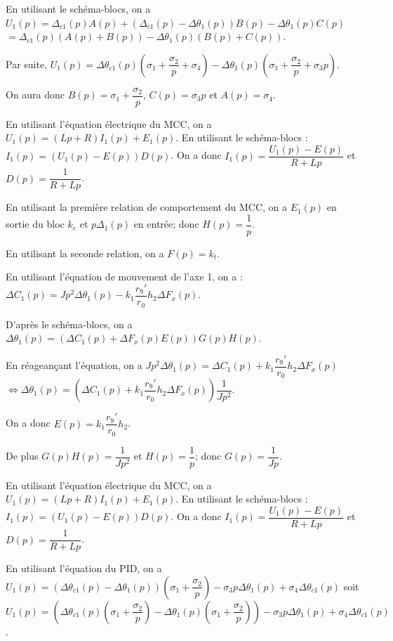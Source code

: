 \begin{corrigebox}
En utilisant le schéma-blocs, on a 
$U_1(p)=\Delta_{c1}(p) A(p) + \left(\Delta_{c1}(p) -\Delta\theta_{1}(p)\right) B(p) - \Delta\theta_{1}(p)C(p)$
$=\Delta_{c1}(p) \left( A(p) + B(p)\right) -\Delta\theta_{1}(p)  \left(B(p)+C(p)\right)$.

Par suite, 
$U_1(p)= \Delta \theta_{c1}(p) \left(\sigma_1 + \dfrac{\sigma_2}{p} +\sigma_4\right) -\Delta \theta_1(p) \left(\sigma_1 + \dfrac{\sigma_2}{p} + \sigma_3p\right)$.

On aura donc $B(p)=\sigma_1 + \dfrac{\sigma_2}{p}$, $C(p)=\sigma_3 p$ et  $A(p)=\sigma_4$.

En utilisant l'équation électrique du MCC, on a 
$U_1(p)=\left(L p   + R\right)I_1(p)+E_1(p)$. En utilisant le schéma-blocs :  $I_1(p)=\left(U_1(p) - E(p)\right) D(p)$. On a donc 
$I_1(p)=\dfrac{U_1(p) - E(p)}{R+Lp}$ et $D(p) = \dfrac{1}{R+Lp}$.

En utilisant la première relation de comportement du MCC, on a $E_1(p)$ en sortie du bloc $k_e$ et $p\Delta_1(p)$ en entrée; donc $H(p)=\dfrac{1}{p}$.

En utilisant la seconde relation, on a $F(p)=k_t$.

En utilisant l'équation de mouvement de l'axe 1, on a :
$\Delta C_1(p)=J p ^2  \Delta \theta_1(p) - k_1 \dfrac{r_9'}{r_0}h_2 \Delta F_x(p)$.

D'après le schéma-blocs, on a $\Delta \theta_1(p) = \left(\Delta C_1(p)+\Delta F_x(p) E(p)\right) G(p)H(p)$.

En réageançant l'équation, on a 
$J p ^2  \Delta \theta_1(p) = \Delta C_1(p) +  k_1 \dfrac{r_9'}{r_0}h_2 \Delta F_x(p) $
$ \Leftrightarrow   \Delta \theta_1(p) = \left(\Delta C_1(p) +  k_1 \dfrac{r_9'}{r_0}h_2 \Delta F_x(p)\right) \dfrac{1}{J p ^2} $.

On a donc $E(p)= k_1 \dfrac{r_9'}{r_0}h_2 $. 

De plus $G(p)H(p)=\dfrac{1}{Jp^2}$ et $H(p)=\dfrac{1}{p}$; donc $G(p)=\dfrac{1}{Jp}$.

En utilisant l'équation électrique du MCC, on a 
$U_1(p)=\left(L p   + R\right)I_1(p)+E_1(p)$. En utilisant le schéma-blocs :  $I_1(p)=\left(U_1(p) - E(p)\right) D(p)$. On a donc 
$I_1(p)=\dfrac{U_1(p) - E(p)}{R+Lp}$ et $D(p) = \dfrac{1}{R+Lp}$.

En utilisant l'équation du PID, on a 
$U_1(p)=\left( \Delta \theta_{c1}(p)-\Delta \theta_1(p)\right) \left(\sigma_1 + \dfrac{\sigma_2}{p}\right)- \sigma_3p \Delta \theta_1(p)+\sigma_4\Delta \theta_{c1}(p)$
soit $U_1(p)=\left( \Delta \theta_{c1}(p) \left(\sigma_1 + \dfrac{\sigma_2}{p}\right) -\Delta \theta_1(p) \left(\sigma_1 + \dfrac{\sigma_2}{p}\right)\right) - \sigma_3p \Delta \theta_1(p)+\sigma_4\Delta \theta_{c1}(p)$.


\end{corrigebox}
